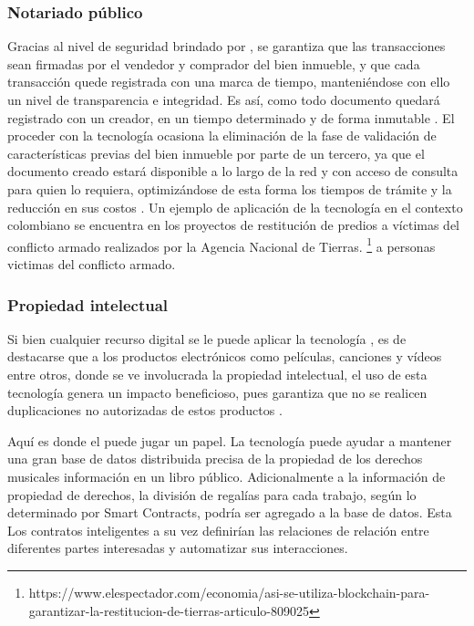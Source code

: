 \subsubsection{Notariado público}
Gracias al nivel de seguridad brindado por \blckchn, se garantiza que las transacciones sean firmadas por el vendedor y comprador del bien inmueble, y que cada transacción quede registrada con una marca de tiempo, manteniéndose con ello un nivel de transparencia e integridad. Es así, como todo documento quedará registrado con un creador, en un tiempo determinado y de forma inmutable \citep{zheng2016blockchain}. 
El proceder con la tecnología \blckchn ocasiona la eliminación de la fase de validación de características previas del bien inmueble por parte de un tercero, ya que el documento creado estará disponible a lo largo de la red y con acceso de consulta para quien lo requiera, optimizándose de esta forma los tiempos de trámite y la reducción en sus costos \citep{crosby2016blockchain}. 
Un ejemplo de aplicación de la tecnología \blckchn en el contexto colombiano se encuentra en los proyectos de restitución de predios a víctimas del conflicto armado realizados por la Agencia Nacional de Tierras. \footnote{https://www.elespectador.com/economia/asi-se-utiliza-blockchain-para-garantizar-la-restitucion-de-tierras-articulo-809025} a personas victimas del conflicto armado.

\subsubsection{Propiedad intelectual}
Si bien cualquier recurso digital se le puede aplicar la tecnología \blckchn, es de destacarse que a los productos  electrónicos como películas, canciones y vídeos entre otros, donde se ve involucrada la propiedad intelectual, el uso de esta tecnología genera un impacto beneficioso, pues garantiza que no se realicen duplicaciones no autorizadas de estos productos \citep{huckle2016internet}.

\begin{center}
    \begin{minipage}{0.9\linewidth}
        \vspace{5pt}%
        {\small

Aquí es donde el \blckchn puede jugar un papel. La tecnología puede ayudar a mantener una gran base de datos distribuida precisa de la propiedad de los derechos musicales información en un libro público. Adicionalmente a la información de propiedad de derechos, la división de regalías para cada trabajo, según lo determinado por Smart Contracts, podría ser agregado a la base de datos. Esta Los contratos inteligentes a su vez definirían las relaciones de relación entre diferentes partes interesadas  y automatizar sus interacciones.
        }
        \begin{flushright}
            \citep{crosby2016blockchain}
        \end{flushright}
        \vspace{5pt}%
    \end{minipage}
\end{center}

